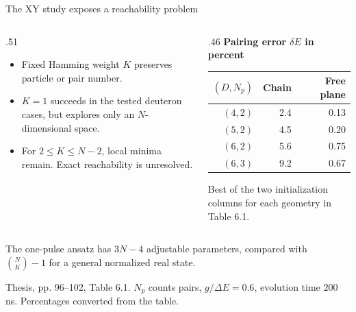 \documentclass[11pt,aspectratio=169]{beamer}
\newcommand{\src}[1]{\par\vfill{\fontsize{7}{8}\selectfont\color{gray}#1\par}}
\begin{document}
\begin{frame}{The XY study exposes a reachability problem}
\begin{columns}[T]
\begin{column}{.51\textwidth}
\begin{itemize}\setlength\itemsep{.55em}
\item Fixed Hamming weight $K$ preserves particle or pair number.
\item $K=1$ succeeds in the tested deuteron cases, but explores only an $N$-dimensional space.
\item For $2\le K\le N-2$, local minima remain. Exact reachability is unresolved.
\end{itemize}
\end{column}
\begin{column}{.46\textwidth}
\small
\textbf{Pairing error $\delta E$ in percent}\par\smallskip
\renewcommand{\arraystretch}{1.2}
\begin{tabular}{@{}rrr@{}}\toprule
$(D,N_p)$&Chain&Free plane\\\midrule
$(4,2)$&2.4&0.13\\
$(5,2)$&4.5&0.20\\
$(6,2)$&5.6&0.75\\
$(6,3)$&9.2&0.67\\\bottomrule
\end{tabular}\par
\smallskip\par
Best of the two initialization columns for each geometry in Table 6.1.
\end{column}
\end{columns}
\medskip
The one-pulse ansatz has $3N-4$ adjustable parameters, compared with $\binom{N}{K}-1$ for a general normalized real state.
\src{Thesis, pp. 96--102, Table 6.1. $N_p$ counts pairs, $g/\Delta E=0.6$, evolution time 200 ns. Percentages converted from the table.}
\end{frame}
\end{document}
